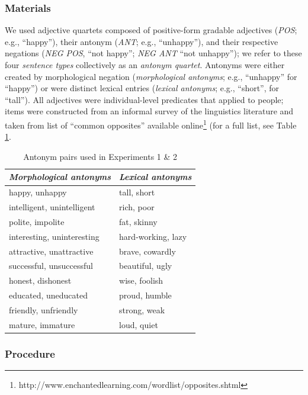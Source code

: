 \documentclass[10pt,letterpaper]{article}
\newcommand{\tableref}[1]{Table \ref{#1}}
\begin{document}
\subsubsection{Materials}

We used adjective quartets composed of positive-form gradable adjectives (\emph{POS}; e.g., ``happy''), their antonym (\emph{ANT}; e.g., ``unhappy''), and their respective negations (\emph{NEG POS}, ``not happy''; \emph{NEG ANT} ``not unhappy''); we refer to these four \emph{sentence types} collectively as an \emph{antonym quartet}.
Antonyms were either created by morphological negation (\emph{morphological antonyms}; e.g., ``unhappy'' for ``happy'') or were distinct lexical entries (\emph{lexical antonyms}; e.g., ``short'', for ``tall'').
All adjectives were individual-level predicates that applied to people; items were constructed from an informal survey of the linguistics literature and taken from list of ``common opposites'' available online\footnote{http://www.enchantedlearning.com/wordlist/opposites.shtml} (for a full list, see \tableref{tab:items}.

\begin{table}[b]
\centering
\begin{tabular}{l|l}
\emph{Morphological antonyms}     & \emph{Lexical antonyms}    \\ 
\hline
happy, unhappy             & tall, short         \\
intelligent, unintelligent & rich, poor          \\
polite, impolite           & fat, skinny         \\
interesting, uninteresting & hard-working, lazy  \\
attractive, unattractive   & brave, cowardly     \\
successful, unsuccessful   & beautiful, ugly     \\
honest, dishonest          & wise, foolish       \\
educated, uneducated       & proud, humble       \\
friendly, unfriendly       & strong, weak        \\
mature, immature           & loud, quiet        
\end{tabular}
\caption{Antonym pairs used in Experiments 1 \& 2}
\label{tab:items}
\end{table}


\subsubsection{Procedure}
\end{document}
